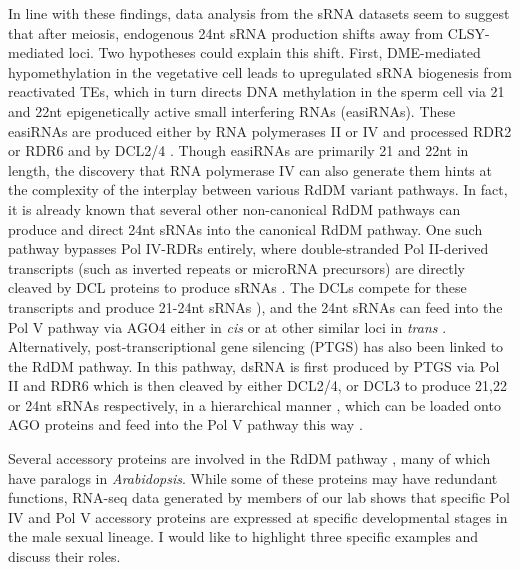 In line with these findings, data analysis from the sRNA datasets seem to suggest that after meiosis, endogenous 24nt sRNA production shifts away from CLSY-mediated loci. Two hypotheses could explain this shift. First, DME-mediated hypomethylation in the vegetative cell leads to upregulated sRNA biogenesis from reactivated TEs, which in turn directs DNA methylation in the sperm cell \cite{RN57,RN39} via 21 and 22nt epigenetically active small interfering RNAs (easiRNAs). These easiRNAs are produced either by RNA polymerases II or IV and processed RDR2 or RDR6 and by DCL2/4 \cite{RN75}. Though easiRNAs are primarily 21 and 22nt in length, the discovery that RNA polymerase IV can also generate them hints at the complexity of the interplay between various RdDM variant pathways. In fact, it is already known that several other non-canonical RdDM pathways can produce and direct 24nt sRNAs into the canonical RdDM pathway. One such pathway bypasses Pol IV-RDRs entirely, where double-stranded Pol II-derived transcripts (such as inverted repeats or microRNA precursors) are directly cleaved by DCL proteins to produce sRNAs \cite{RN269}. The DCLs compete for these transcripts and produce 21-24nt sRNAs \cite{RN268}), and the 24nt sRNAs can feed into the Pol V pathway via AGO4 either in \textit{cis} or at other similar loci in \textit{trans} \cite{RN270,RN269}. Alternatively, post-transcriptional gene silencing (PTGS) has also been linked to the RdDM pathway. In this pathway, dsRNA is first produced by PTGS via Pol II and RDR6 which is then cleaved by either DCL2/4, or DCL3 to produce 21,22 or 24nt sRNAs respectively, in a hierarchical manner \cite{RN267}, which can be loaded onto AGO proteins and feed into the Pol V pathway this way \cite{RN133}. 

Several accessory proteins are involved in the RdDM pathway \cite{RN33}, many of which have paralogs in \textit{Arabidopsis}. While some of these proteins may have redundant functions, RNA-seq data generated by members of our lab shows that specific Pol IV and Pol V accessory proteins are expressed at specific developmental stages in the male sexual lineage. I would like to highlight three specific examples and discuss their roles. 

